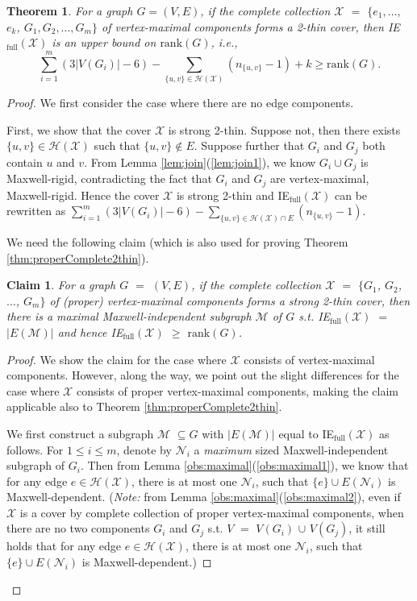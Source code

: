 \documentclass[10pt]{article}
\def\M{\mathcal {M}}
\def\N{\mathcal {N}}
\def\H{\mathcal {H}}
\def\X{\mathcal {X}}
\newtheorem{thm}{Theorem}
\newtheorem{clm}{Claim}
\begin{document}
\begin{thm}\label{thm:complete2thin}
For a graph $G=(V, E)$, if the complete collection $\X$ $=$ $\{e_1, \ldots,$ $e_k$, $G_1, G_2, \ldots, G_m\}$ of vertex-maximal components forms a 2-thin cover, then IE$_{\text{full}}(\X)$ is an upper bound on $\text{rank}(G)$, i.e., $$\sum\limits_{i=1}^m{(3|V(G_i)| - 6)} - \sum\limits_{\{u, v\} \in \H(\X)}(n_{\{u, v\}}
-1) + k \geq \text{rank}(G).$$ \end{thm}

\begin{proof}
We first consider the case where there are no edge components.

First, we show that the cover $\X$ is strong 2-thin. Suppose not, then there exists $\{u, v\}\in \H(\X)$ such that $\{u, v\}\notin E$. Suppose further that $G_i$ and $G_j$ both contain $u$ and $v$. From Lemma \ref{lem:join}(\ref{lem:join1}), we know $G_i\cup G_j$ is Maxwell-rigid, contradicting the fact that $G_i$ and $G_j$ are vertex-maximal, Maxwell-rigid.  Hence the cover $\X$ is strong 2-thin and IE$_{\text{full}}(\X)$ can be rewritten as $\sum\limits_{i=1}^m (3|V(G_i)| - 6)
-\sum\limits_{\{u, v\} \in \H(\X)\cap E}(n_{\{u, v\}}
-1)$.

We need the following claim (which is also used for proving Theorem \ref{thm:properComplete2thin}).

\medskip
\begin{clm}\label{clm:2thin}
For a graph $G$ $=$ $(V, E)$, if the complete collection $\X$ $=$ $\{G_1$, $G_2$, $\ldots$, $G_m\}$ of (proper) vertex-maximal components forms a strong 2-thin cover, then there is a maximal Maxwell-independent subgraph $\M$ of $G$ s.t. IE$_{\text{full}}(\X)$ $=$ $|E(\M)|$ and hence IE$_{\text{full}}(\X)$ $\ge$ $\text{rank}(G)$.
\end{clm}

\begin{proof}
We show the claim for the case where $\X$ consists of vertex-maximal components. However, along the way, we point out the slight differences for the case where $\X$ consists of proper vertex-maximal components, making the claim applicable also to Theorem \ref{thm:properComplete2thin}.

We first construct a subgraph $\M$ $\subseteq G$ with $|E(\M)|$ equal to IE$_{\text{full}}(\X)$ as follows. For $1\leq i \leq m$, denote by $\N_i$ a {\em maximum} sized Maxwell-independent subgraph of $G_i$. Then from Lemma \ref{obs:maximal}(\ref{obs:maximal1}), we know that for any edge $e\in \H(\X)$, there is at most one $\N_i$, such that $ \{e\} \cup E(\N_i)$ is Maxwell-dependent. ({\em Note:} from Lemma \ref{obs:maximal}(\ref{obs:maximal2}), even if $\X$ is a cover by complete collection of proper vertex-maximal components, when there are no two components $G_i$ and $G_j$ s.t. $V$ $=$ $V(G_i)$ $\cup$ $V(G_j)$, it still holds that for any edge $e\in \H(\X)$, there is at most one $\N_i$, such that $ \{e\} \cup E(\N_i)$ is Maxwell-dependent.)




\end{proof}
\end{proof}
\end{document}

